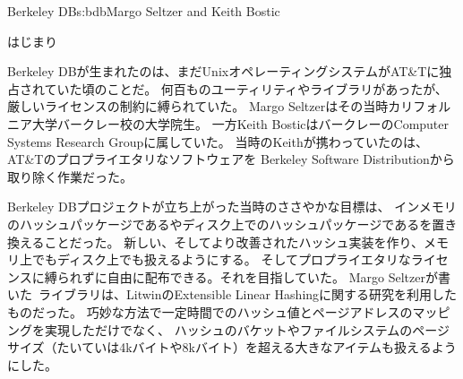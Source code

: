 \begin{aosachapter}{Berkeley DB}{s:bdb}{Margo Seltzer and Keith Bostic}
\begin{aosasect1}{はじまり}

Berkeley DBが生まれたのは、まだUnixオペレーティングシステムがAT\&Tに独占されていた頃のことだ。
何百ものユーティリティやライブラリがあったが、厳しいライセンスの制約に縛られていた。
Margo Seltzerはその当時カリフォルニア大学バークレー校の大学院生。
一方Keith BosticはバークレーのComputer Systems Research Groupに属していた。
当時のKeithが携わっていたのは、AT\&Tのプロプライエタリなソフトウェアを
Berkeley Software Distributionから取り除く作業だった。

Berkeley DBプロジェクトが立ち上がった当時のささやかな目標は、
インメモリのハッシュパッケージであるやディスク上でのハッシュパッケージであるを置き換えることだった。
新しい、そしてより改善されたハッシュ実装を作り、メモリ上でもディスク上でも扱えるようにする。
そしてプロプライエタリなライセンスに縛られずに自由に配布できる。それを目指していた。
Margo Seltzerが書いた~\cite{bib:seltzer:hash}ライブラリは、LitwinのExtensible Linear Hashingに関する研究を利用したものだった。
巧妙な方法で一定時間でのハッシュ値とページアドレスのマッピングを実現しただけでなく、
ハッシュのバケットやファイルシステムのページサイズ（たいていは4kバイトや8kバイト）を超える大きなアイテムも扱えるようにした。


\end{aosasect1}
\end{aosachapter}
